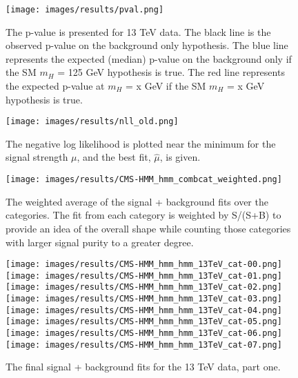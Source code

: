 \begin{figure}[h!]
    \centering
    \texttt{[image: images/results/pval.png]}
    \caption[The p-value on the background-only hypothesis using 13 TeV data alone.]
    {The p-value is presented for 13 TeV data. The black line is the observed p-value on the background only hypothesis. The blue line represents the expected (median) p-value on the background only if the SM $m_H$ = 125 GeV hypothesis is true. The red line represents the expected p-value at $m_H$ = x GeV if the SM $m_H$ = x GeV hypothesis is true.}
    \label{fig:pval13}
\end{figure}
\begin{figure}[h!]
    \centering
    \texttt{[image: images/results/nll\_old.png]}
    \caption[A plot of the negative log likelihood near the minimum for the signal strength.]
    {The negative log likelihood is plotted near the minimum for the signal strength $\mu$, and the best fit, $\hat{\mu}$, is given.}
    \label{fig:signalstrength13}
\end{figure}
\begin{figure}[h!]
    \centering
    \texttt{[image: images/results/CMS-HMM\_hmm\_combcat\_weighted.png]}
    \caption[The weighted average of the signal + background fits for 13 TeV data.]
    {The weighted average of the signal + background fits over the categories. The fit from each category is weighted by S/(S+B) to provide an idea of the overall shape while counting those categories with larger signal purity to a greater degree.}
    \label{fig:splusbweight}
\end{figure}
\begin{figure}[h!]
    \centering
    \texttt{[image: images/results/CMS-HMM\_hmm\_hmm\_13TeV\_cat-00.png]}
    \texttt{[image: images/results/CMS-HMM\_hmm\_hmm\_13TeV\_cat-01.png]}
    \texttt{[image: images/results/CMS-HMM\_hmm\_hmm\_13TeV\_cat-02.png]}
    \texttt{[image: images/results/CMS-HMM\_hmm\_hmm\_13TeV\_cat-03.png]}
    \texttt{[image: images/results/CMS-HMM\_hmm\_hmm\_13TeV\_cat-04.png]}
    \texttt{[image: images/results/CMS-HMM\_hmm\_hmm\_13TeV\_cat-05.png]}
    \texttt{[image: images/results/CMS-HMM\_hmm\_hmm\_13TeV\_cat-06.png]}
    \texttt{[image: images/results/CMS-HMM\_hmm\_hmm\_13TeV\_cat-07.png]}
    \caption[Signal + background fits for the individual categories on 13 TeV data.]
    {The final signal + background fits for the 13 TeV data, part one.}
    \label{fig:fitsbycat1}
\end{figure}
